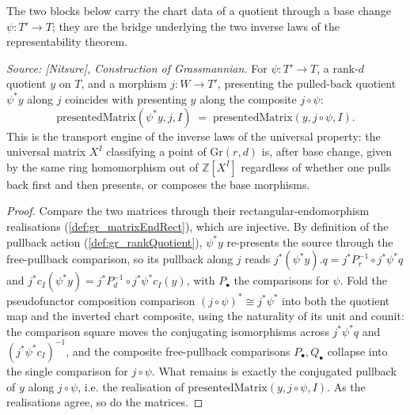 The two blocks below carry the chart data of a quotient through a base change
\(\psi : T' \to T\); they are the bridge underlying the two inverse laws of the
representability theorem.

\begin{lemma}
  \label{lem:gr_presentedMatrix_rqPullback}
  \textit{Source: [Nitsure], Construction of Grassmannian.}
  For \(\psi : T' \to T\), a rank-\(d\) quotient \(y\) on \(T\), and a morphism
  \(j : W \to T'\), presenting the pulled-back quotient \(\psi^{*}y\) along \(j\) coincides
  with presenting \(y\) along the composite \(j\circ\psi\):
  \[
    \mathrm{presentedMatrix}(\psi^{*}y, j, I)
      \;=\; \mathrm{presentedMatrix}(y, j\circ\psi, I).
  \]
  This is the transport engine of the inverse laws of the universal property: the universal
  matrix \(X^I\) classifying a point of \(\mathrm{Gr}(r,d)\) is, after base change, given by
  the same ring homomorphism out of \(\mathbb{Z}[X^I]\) regardless of whether one pulls back
  first and then presents, or composes the base morphisms.
\end{lemma}
\begin{proof}
  \leanok
  Compare the two matrices through their rectangular-endomorphism realisations
  (\cref{def:gr_matrixEndRect}), which are injective. By definition of the pullback action
  (\cref{def:gr_rankQuotient}), \(\psi^{*}y\) re-presents the source through the free-pullback
  comparison, so its pullback along \(j\) reads \(j^{*}(\psi^{*}y).q = j^{*}P_r^{-1}\circ
  j^{*}\psi^{*}q\) and \(j^{*}c_I(\psi^{*}y) = j^{*}P_d^{-1}\circ j^{*}\psi^{*}c_I(y)\), with
  \(P_\bullet\) the comparisons for \(\psi\). Fold the pseudofunctor composition comparison
  \((j\circ\psi)^{*}\cong j^{*}\psi^{*}\) into both the quotient map and the inverted chart
  composite, using the naturality of its unit and counit: the comparison square moves the
  conjugating isomorphisms across \(j^{*}\psi^{*}q\) and \((j^{*}\psi^{*}c_I)^{-1}\), and the
  composite free-pullback comparisons \(P_\bullet, Q_\bullet\) collapse into the single
  comparison for \(j\circ\psi\). What remains is exactly the conjugated pullback of \(y\)
  along \(j\circ\psi\), i.e. the realisation of \(\mathrm{presentedMatrix}(y, j\circ\psi, I)\).
  As the realisations agree, so do the matrices.
\end{proof}

